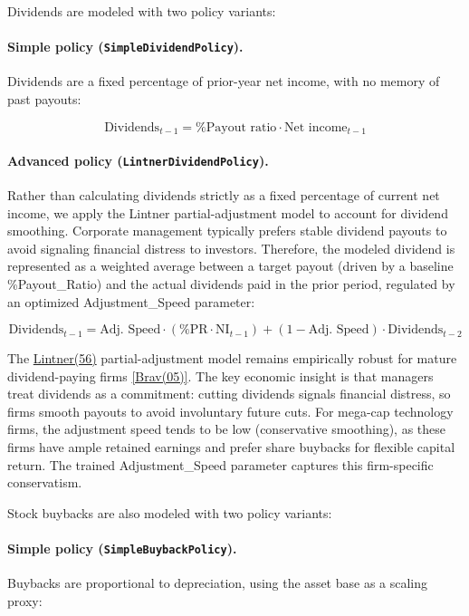\documentclass[12pt,a4paper]{article}
\begin{document}
Dividends are modeled with two policy variants:\label{sec:dividends}

\paragraph{Simple policy (\texttt{SimpleDividendPolicy}).}
Dividends are a fixed percentage of prior-year net income, with no
memory of past payouts:

\begin{equation}\label{eq:target_dividends}
\text{Dividends}_{t-1} = \text{\%Payout ratio} \cdot \text{Net income}_{t-1}
\end{equation}

\paragraph{Advanced policy (\texttt{LintnerDividendPolicy}).}
Rather than calculating dividends strictly as a fixed percentage of
current net income, we apply the Lintner partial-adjustment model to
account for dividend smoothing. Corporate management typically prefers
stable dividend payouts to avoid signaling financial distress to
investors. Therefore, the modeled dividend is represented as a weighted
average between a target payout (driven by a baseline \%Payout\_Ratio)
and the actual dividends paid in the prior period, regulated by an
optimized Adjustment\_Speed parameter:

\begin{equation}\label{eq:lintner_dividends}
\text{Dividends}_{t-1} = \text{Adj.\ Speed} \cdot (\text{\%PR} \cdot \text{NI}_{t-1}) + (1 - \text{Adj.\ Speed}) \cdot \text{Dividends}_{t-2}
\end{equation}

The \hyperlink{ref:lintner56}{Lintner(56)} partial-adjustment model remains empirically robust for mature dividend-paying firms \hyperlink{ref:brav05}{[Brav(05)]}. The key economic insight is that managers treat dividends as a commitment: cutting dividends signals financial distress, so firms smooth payouts to avoid involuntary future cuts. For mega-cap technology firms, the adjustment speed tends to be low (conservative smoothing), as these firms have ample retained earnings and prefer share buybacks for flexible capital return. The trained Adjustment\_Speed parameter captures this firm-specific conservatism.

Stock buybacks are also modeled with two policy variants:

\paragraph{Simple policy (\texttt{SimpleBuybackPolicy}).}
Buybacks are proportional to depreciation, using the asset base as a
scaling proxy:
\end{document}

